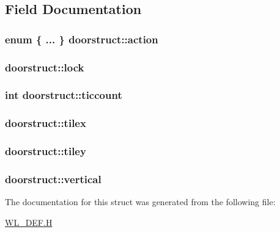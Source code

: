 \subsection{Field Documentation}
\hypertarget{structdoorstruct_a5e798f42031dd553fa37a7d63ef542d4}{
\subsubsection[{action}]{\setlength{\rightskip}{0pt plus 5cm}enum \{ ... \} 	 {\bf doorstruct::action}}}
\label{structdoorstruct_a5e798f42031dd553fa37a7d63ef542d4}
\hypertarget{structdoorstruct_a17c9dd3fb2cbe9c4db6dd4b15ed47f38}{
\subsubsection[{lock}]{ {\bf doorstruct::lock}}}
\label{structdoorstruct_a17c9dd3fb2cbe9c4db6dd4b15ed47f38}
\hypertarget{structdoorstruct_a0b1fa6bebc4cf5eabf39c2d3606bbbaf}{
\subsubsection[{ticcount}]{\setlength{\rightskip}{0pt plus 5cm}int {\bf doorstruct::ticcount}}}
\label{structdoorstruct_a0b1fa6bebc4cf5eabf39c2d3606bbbaf}
\hypertarget{structdoorstruct_a7cbf7d1a9a3596b09d30e45f89c1d104}{
\subsubsection[{tilex}]{ {\bf doorstruct::tilex}}}
\label{structdoorstruct_a7cbf7d1a9a3596b09d30e45f89c1d104}
\hypertarget{structdoorstruct_aefb09ceda5d4ba9188ab0c51ef4bd76d}{
\subsubsection[{tiley}]{ {\bf doorstruct::tiley}}}
\label{structdoorstruct_aefb09ceda5d4ba9188ab0c51ef4bd76d}
\hypertarget{structdoorstruct_a75a44cbc685156739642334bf9706666}{
\subsubsection[{vertical}]{ {\bf doorstruct::vertical}}}
\label{structdoorstruct_a75a44cbc685156739642334bf9706666}


The documentation for this struct was generated from the following file:\begin{DoxyCompactItemize}
\item 
\hyperlink{WL__DEF_8H}{WL\_\-DEF.H}\end{DoxyCompactItemize}
